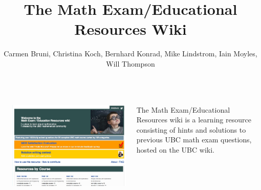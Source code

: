 \documentclass[final]{beamer}
\title{The Math Exam/Educational Resources Wiki} %
\author{Carmen Bruni, Christina Koch, Bernhard Konrad, Mike Lindstrom, Iain Moyles, Will Thompson} %
\institute{Department of Mathematics, The University of British Columbia} %
\newlength{\sepwid}
\newlength{\onecolwid}
\begin{document}

\setlength{\belowcaptionskip}{2ex} %
\setlength\belowdisplayshortskip{2ex} %

\begin{frame}[t] %

\begin{columns}[t] %

\begin{column}{\sepwid}\end{column} %

\begin{column}{\onecolwid} %



\begin{columns}
    \begin{column}{.5\textwidth}
        \includegraphics[width=\textwidth]{frontpage3.jpg}
    \end{column}
    \begin{column}{.5\textwidth}
    The Math Exam/Educational Resources wiki is a learning resource consisting of hints and solutions to previous UBC math exam questions, hosted on the UBC wiki.
    \end{column}
\end{columns}


\end{column}
\end{columns}
\end{frame}
\end{document}
